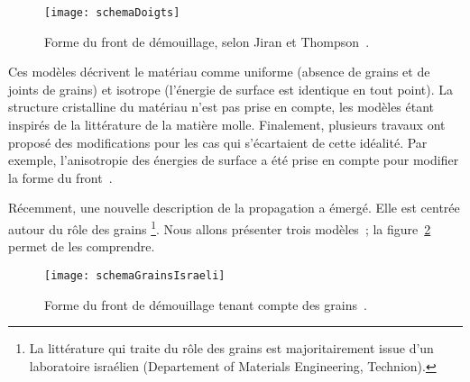 \begin{figure}[!htb]
	\centering
	\texttt{[image: schemaDoigts]}
	\caption{Forme du front de démouillage, selon Jiran et Thompson~\cite{jiran1990capillary,jiran1992capillary}.}
	\label{schemaDoigts}
\end{figure}

Ces modèles décrivent le matériau comme uniforme (absence de grains et de joints de grains) et isotrope (l'énergie de surface est identique en tout point). La structure cristalline du matériau n'est pas prise en compte, les modèles étant inspirés de la littérature de la matière molle. Finalement, plusieurs travaux ont proposé des modifications pour les cas qui s'écartaient de cette idéalité. Par exemple, l'anisotropie des énergies de surface a été prise en compte pour modifier la forme du front~\cite{klinger2011kinetics, zucker2013model}.\par 
Récemment, une nouvelle description de la propagation a émergé. Elle est centrée autour du rôle des grains \footnote{La littérature qui traite du rôle des grains est majoritairement issue d'un laboratoire israélien (Departement of Materials Engineering, Technion).}. Nous allons présenter trois modèles~; la figure~\ref{schemaGrainsIsraeli} permet de les comprendre.\par 

\begin{figure}[!htb]
	\centering
	\texttt{[image: schemaGrainsIsraeli]}
	\caption{Forme du front de démouillage tenant compte des grains~\cite{atiya2014role, kosinova2014role, kovalenko2013solid}.}
	\label{schemaGrainsIsraeli}
\end{figure}

